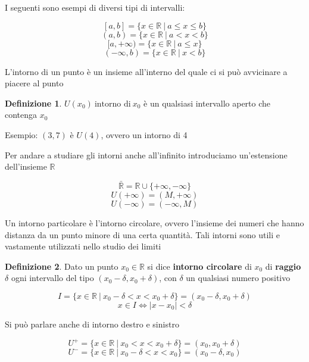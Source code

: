 \documentclass[]{report}
\theoremstyle{definition}
\newtheorem{defin}{Definizione}[chapter]
\theoremstyle{remark}
\theoremstyle{plain}
\numberwithin{equation}{chapter}
\begin{document}
I seguenti sono esempi di diversi tipi di intervalli:

$$[a,b]= \{ x\in\mathbb{R} \ | \ a \leq x \leq b \}$$
$$(a,b)= \{ x\in\mathbb{R} \ | \ a < x < b \}$$
$$[a,+\infty)= \{ x\in\mathbb{R} \ | \ a \leq x\}$$
$$(-\infty,b)= \{ x\in\mathbb{R} \ | \ x < b \}$$

L'intorno di un punto \`{e} un insieme all'interno del quale ci si pu\`{o} avvicinare a piacere al punto

\begin{defin}\label{intorno}
	$U(x_{0}) \ \textrm{intorno di} \ x_{0}$
	\`{e} un qualsiasi intervallo aperto che contenga $x_{0}$
\end{defin}

Esempio:
$(3,7)$ \`{e} $U(4)$, ovvero un intorno di 4

Per andare a studiare gli intorni anche all'infinito introduciamo un'estensione dell'insieme $\mathbb{R}$

$$\bar{\mathbb{R}}=\mathbb{R}\cup \{+\infty,-\infty \}$$
$$U(+\infty)=(M,+\infty)$$
$$U(-\infty)=(-\infty,M)$$

Un intorno particolare \`{e} l'intorno circolare, ovvero l'insieme dei numeri che hanno distanza da un punto minore di una certa quantit\`{a}. Tali intorni sono utili e vastamente utilizzati nello studio dei limiti

\begin{defin}\label{intorno circolare}
	Dato un punto $ x_{0} \in \mathbb{R}$ si dice \textbf{intorno circolare} di $x_{0}$ di \textbf{raggio} $\delta$ ogni intervallo del tipo $(x_{0}-\delta,x_{0}+\delta)$, con $\delta$ un qualsiasi numero positivo

	$$I=\{ x \in \mathbb{R} \ | \ x_{0}- \delta < x < x_{0} + \delta \} = (x_{0}-\delta,x_{0}+\delta)$$
	$$x \in I \Leftrightarrow |x-x_{0}|<\delta $$
\end{defin}

Si pu\`{o} parlare anche di intorno destro e sinistro 

$$U^{+}=\{ x \in \mathbb{R} \ | \ x_{0} < x < x_{0} + \delta \} = (x_{0},x_{0}+\delta)$$
$$U^{-}=\{ x \in \mathbb{R} \ | \ x_{0}- \delta < x < x_{0} \} = (x_{0}-\delta,x_{0})$$
\end{document}
